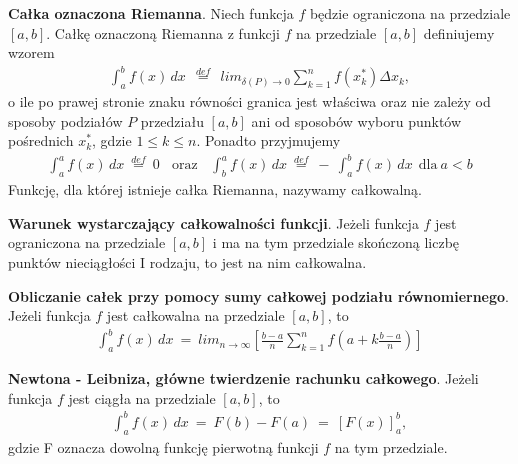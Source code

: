 \documentclass[main.tex]{subfiles}
\begin{document}
    \begin{definition}
        \textbf{Całka oznaczona Riemanna}. Niech funkcja $f$ będzie ograniczona na przedziale $[a,b]$. Całkę oznaczoną
        Riemanna z funkcji  $f$  na przedziale $[a,b]$ definiujemy wzorem
        \begin{align*}
            \int_{a}^{b} f(x) \,dx ~~ \stackrel{def}{=} ~~ lim_{\delta(P)  \rightarrow 0} \sum_{k=1}^{n} f(x^{*}_k) \Delta x_k,
        \end{align*}
        o ile po prawej stronie znaku równości granica jest właściwa oraz nie zależy od sposoby podziałów $P$ przedziału
        $[a,b]$ ani od sposobów wyboru punktów pośrednich $x^{*}_k$, gdzie $1 \leq k \leq n$. Ponadto przyjmujemy
        \begin{align*}
            \int_a^a f(x)\,dx ~ \stackrel{def}{=} ~ 0 ~~~~ \text{oraz} ~~~~ \int_b^a f(x)\,dx ~ \stackrel{def}{=} ~ - ~ \int_a^b f(x) \,dx ~~ \text{dla} ~ a < b
        \end{align*}
        Funkcję, dla której istnieje całka Riemanna, nazywamy całkowalną.
    \end{definition}

    \begin{theorem}
        \textbf{Warunek wystarczający całkowalności funkcji}. Jeżeli funkcja $f$ jest ograniczona na przedziale $[a,b]$
        i ma na tym przedziale skończoną liczbę punktów nieciągłości I rodzaju, to jest na nim całkowalna.
    \end{theorem}

    \begin{theorem}
        \textbf{Obliczanie całek przy pomocy sumy całkowej podziału równomiernego}. Jeżeli funkcja $f$ jest całkowalna
        na przedziale $[a,b]$, to
        \begin{align*}
            \int_{a}^b f(x) \, dx ~ = ~ lim_{n \rightarrow \infty} [\frac{b - a}{n} \sum_{k=1}^n f (a + k \frac{b - a}{n})]
        \end{align*}
    \end{theorem}

    \begin{theorem}
        \textbf{Newtona - Leibniza, główne twierdzenie rachunku całkowego}. Jeżeli funkcja $f$ jest ciągła na przedziale
        $[a,b]$, to
        \begin{align*}
            \int_a^b f(x) \,dx ~ = ~ F(b) - F(a) ~ = ~ [F(x)]_a^b,
        \end{align*}
        gdzie F oznacza dowolną funkcję pierwotną funkcji $f$  na tym przedziale.
    \end{theorem}
\end{document}
